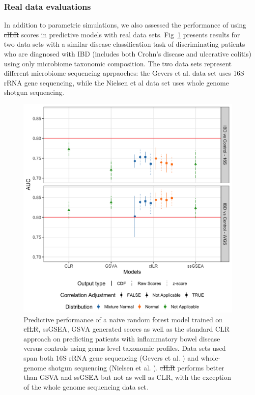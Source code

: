 \documentclass[10pt,letterpaper]{article}
\providecommand{\DIFaddtex}[1]{{\protect\color{blue}\uwave{#1}}} %
\providecommand{\DIFdeltex}[1]{{\protect\color{red}\sout{#1}}}                      %
\providecommand{\DIFaddbegin}{} %
\providecommand{\DIFaddend}{} %
\providecommand{\DIFdelbegin}{} %
\providecommand{\DIFdelend}{} %
\providecommand{\DIFaddFL}[1]{\DIFadd{#1}} %
\providecommand{\DIFdelFL}[1]{\DIFdel{#1}} %
\providecommand{\DIFaddbeginFL}{} %
\providecommand{\DIFaddendFL}{} %
\providecommand{\DIFdelbeginFL}{} %
\providecommand{\DIFdelendFL}{} %
\providecommand{\DIFadd}[1]{\texorpdfstring{\DIFaddtex{#1}}{#1}} %
\providecommand{\DIFdel}[1]{\texorpdfstring{\DIFdeltex{#1}}{}} %
\newcommand{\DIFscaledelfig}{0.5}
\newlength{\DIFdelgraphicswidth} %
\newlength{\DIFdelgraphicsheight} %
\newcommand{\DIFaddincludegraphics}[2][]{{\color{blue}\fbox{\DIFOincludegraphics[#1]{#2}}}} %
\newcommand{\DIFdelincludegraphics}[2][]{%
\sbox{\DIFdelgraphicsbox}{\DIFOincludegraphics[#1]{#2}}%
\settoboxwidth{\DIFdelgraphicswidth}{\DIFdelgraphicsbox} %
\settoboxtotalheight{\DIFdelgraphicsheight}{\DIFdelgraphicsbox} %
\scalebox{\DIFscaledelfig}{%
\parbox[b]{\DIFdelgraphicswidth}{\usebox{\DIFdelgraphicsbox}\\[-\baselineskip] \rule{\DIFdelgraphicswidth}{0em}}\llap{\resizebox{\DIFdelgraphicswidth}{\DIFdelgraphicsheight}{%
\setlength{\unitlength}{\DIFdelgraphicswidth}%
\begin{picture}(1,1)%
\thicklines\linethickness{2pt} %
{\color[rgb]{1,0,0}\put(0,0){\framebox(1,1){}}}%
{\color[rgb]{1,0,0}\put(0,0){\line( 1,1){1}}}%
{\color[rgb]{1,0,0}\put(0,1){\line(1,-1){1}}}%
\end{picture}%
}\hspace*{3pt}}} %
} %
\DeclareRobustCommand{\DIFaddbegin}{\DIFOaddbegin \let\includegraphics\DIFaddincludegraphics} %
\DeclareRobustCommand{\DIFaddend}{\DIFOaddend \let\includegraphics\DIFOincludegraphics} %
\DeclareRobustCommand{\DIFdelbegin}{\DIFOdelbegin \let\includegraphics\DIFdelincludegraphics} %
\DeclareRobustCommand{\DIFdelend}{\DIFOaddend \let\includegraphics\DIFOincludegraphics} %
\DeclareRobustCommand{\DIFaddbeginFL}{\DIFOaddbeginFL \let\includegraphics\DIFaddincludegraphics} %
\DeclareRobustCommand{\DIFaddendFL}{\DIFOaddendFL \let\includegraphics\DIFOincludegraphics} %
\DeclareRobustCommand{\DIFdelbeginFL}{\DIFOdelbeginFL \let\includegraphics\DIFdelincludegraphics} %
\DeclareRobustCommand{\DIFdelendFL}{\DIFOaddendFL \let\includegraphics\DIFOincludegraphics} %
\begin{document}
\subsubsection*{Real data evaluations}
In addition to parametric simulations, we also assessed the performance of using \DIFdelbegin \DIFdel{cILR }\DIFdelend \DIFaddbegin \DIFadd{CBEA }\DIFaddend scores in predictive models with real data sets. Fig~\ref{fig:7} presents results for two data sets with a similar disease classification task of discriminating patients who are diagnosed with IBD (includes both Crohn's disease and ulcerative colitis) using only microbiome taxonomic composition. The two data sets represent different microbiome sequencing aprpaoches: the Gevers et al. \cite{gevers2014} data set uses 16S rRNA gene sequencing, while the Nielsen et al \cite{nielsen2014} data set uses whole genome shotgun sequencing. 

\begin{figure}[!h]
    \centering
    \includegraphics[width = \linewidth]{figures/data_prediction_plot.png}
    \caption{Predictive performance of a naive random forest model trained on \DIFdelbeginFL \DIFdelFL{cILR}\DIFdelendFL \DIFaddbeginFL \DIFaddFL{CBEA}\DIFaddendFL , ssGSEA, GSVA generated scores as well as the standard CLR approach on predicting patients with inflammatory bowel disease versus controls using genus level taxonomic profiles. Data sets used span both 16S rRNA gene sequencing (Gevers et al. \cite{gevers2014}) and whole-genome shotgun sequencing (Nielsen et al. \cite{nielsen2014}). \DIFdelbeginFL \DIFdelFL{cILR }\DIFdelendFL \DIFaddbeginFL \DIFaddFL{CBEA }\DIFaddendFL performs better than GSVA and ssGSEA but not as well as CLR, with the exception of the whole genome sequencing data set.}
    \label{fig:7}
\end{figure}
\end{document}
